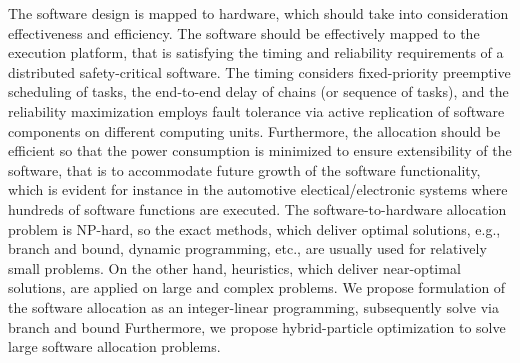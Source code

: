 The software design is mapped to hardware, which should take into consideration effectiveness and efficiency. The software should be effectively mapped to the execution platform, that is satisfying the timing and reliability requirements of a distributed safety-critical software. The timing considers fixed-priority preemptive scheduling of tasks, the end-to-end delay of chains (or sequence of tasks), and the reliability maximization employs fault tolerance via active replication of software components on different computing units. Furthermore, the allocation should be efficient so that the power consumption is minimized to ensure extensibility of the software, that is to accommodate future growth of the software functionality, which is evident for instance in the automotive electical/electronic systems where hundreds of software functions are executed. The software-to-hardware allocation problem is NP-hard, so the exact methods, which deliver optimal solutions, e.g., branch and bound, dynamic programming, etc., are usually used for relatively small problems. On the other hand, heuristics, which deliver near-optimal solutions, are applied on large and complex problems. We propose formulation of the software allocation as an integer-linear programming, subsequently solve via branch and bound Furthermore, we propose hybrid-particle optimization to solve large software allocation problems.

